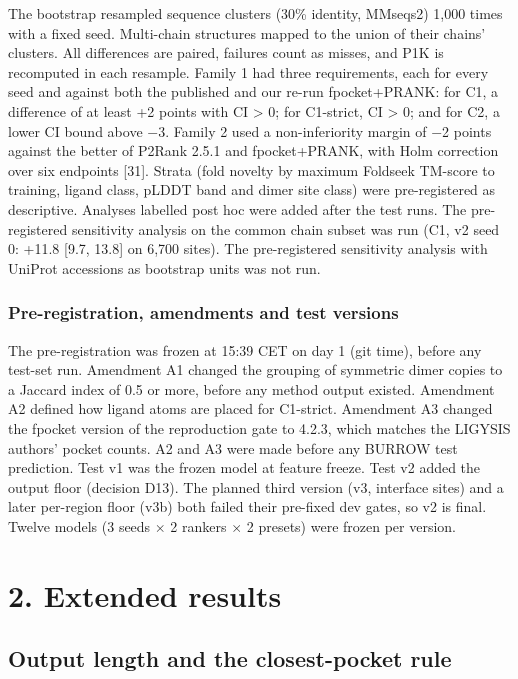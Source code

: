 \documentclass[10pt,letterpaper]{article}
\begin{document}
The bootstrap resampled sequence clusters (30\% identity, MMseqs2) 1,000 times with a fixed seed. Multi-chain structures mapped to the union of their chains' clusters. All differences are paired, failures count as misses, and P1K is recomputed in each resample. Family 1 had three requirements, each for every seed and against both the published and our re-run fpocket+PRANK: for C1, a difference of at least +2 points with CI \textgreater{} 0; for C1-strict, CI \textgreater{} 0; and for C2, a lower CI bound above $-$3. Family 2 used a non-inferiority margin of $-$2 points against the better of P2Rank 2.5.1 and fpocket+PRANK, with Holm correction over six endpoints [31]. Strata (fold novelty by maximum Foldseek TM-score to training, ligand class, pLDDT band and dimer site class) were pre-registered as descriptive. Analyses labelled post hoc were added after the test runs. The pre-registered sensitivity analysis on the common chain subset was run (C1, v2 seed 0: +11.8 [9.7, 13.8] on 6,700 sites). The pre-registered sensitivity analysis with UniProt accessions as bootstrap units was not run.

\subsubsection*{Pre-registration, amendments and test versions}

The pre-registration was frozen at 15:39 CET on day 1 (git time), before any test-set run. Amendment A1 changed the grouping of symmetric dimer copies to a Jaccard index of 0.5 or more, before any method output existed. Amendment A2 defined how ligand atoms are placed for C1-strict. Amendment A3 changed the fpocket version of the reproduction gate to 4.2.3, which matches the LIGYSIS authors' pocket counts. A2 and A3 were made before any BURROW test prediction. Test v1 was the frozen model at feature freeze. Test v2 added the output floor (decision D13). The planned third version (v3, interface sites) and a later per-region floor (v3b) both failed their pre-fixed dev gates, so v2 is final. Twelve models (3 seeds $\times$ 2 rankers $\times$ 2 presets) were frozen per version.

\section*{2. Extended results}

\subsection*{Output length and the closest-pocket rule}
\end{document}
